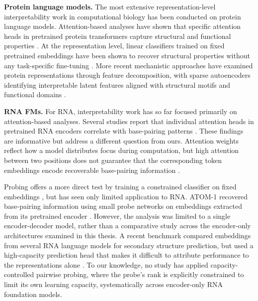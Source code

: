 \documentclass[logo,bsc,singlespacing,parskip]{infthesis}
\begin{document}
\textbf{Protein language models.} The most extensive representation-level interpretability work in computational biology has been conducted on protein language models. Attention-based analyses have shown that specific attention heads in
pretrained protein transformers capture structural and functional
properties \citep{rao2021unsupervised,vig2021bertology}. At the representation level, linear classifiers trained on fixed pretrained embeddings have been shown to recover structural properties without any
task-specific fine-tuning \citep{rives2021biological}. 
More recent mechanistic approaches have examined protein representations through feature decomposition, with sparse autoencoders identifying interpretable latent features aligned with structural motifs and functional domains \citep{simon2025interplm}.

\textbf{RNA FMs.}
For RNA, interpretability work has so far focused primarily on
attention-based analyses. Several studies report that individual
attention heads in pretrained RNA encoders correlate with base-pairing
patterns \citep{zhang2024rnamsm,galanos2025rna,yin2025ernie}. 
These findings are informative but address a different question from ours. Attention weights reflect how a model distributes focus during computation, but high attention between two positions does not guarantee that the corresponding token embeddings encode recoverable base-pairing information \citep{jain2019attention}.

Probing offers a more direct test by training a constrained classifier
on fixed embeddings \citep{hewitt2019structural}, but has seen only
limited application to RNA. ATOM-1 recovered base-pairing information using small probe networks on embeddings extracted from its pretrained encoder \citep{celaj2023atom1}. However, the analysis was limited to a single encoder-decoder model, rather than a comparative study across the encoder-only architectures examined in this thesis. A recent benchmark 
compared embeddings from several RNA language models 
for secondary structure prediction, but used a high-capacity 
prediction head that makes it difficult to attribute 
performance to the representations alone 
\citep{zablocki2025benchmark}. To our knowledge, no study has applied capacity-controlled pairwise probing, where the probe's rank is explicitly constrained to limit its own learning capacity, systematically across encoder-only RNA foundation models.
\end{document}
